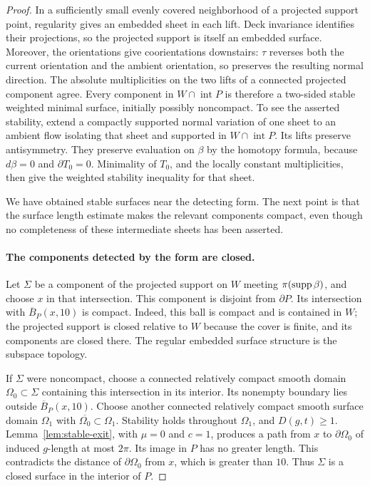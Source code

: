 \begin{proof}
In a sufficiently small evenly covered neighborhood of a projected
support point, regularity gives an embedded sheet in each lift. Deck
invariance identifies their projections, so the projected support is
itself an embedded surface. Moreover, the orientations
give coorientations downstairs: $\tau$ reverses both the current
orientation and the ambient orientation, so preserves the resulting
normal direction. The absolute multiplicities on the two lifts of a
connected projected component agree. Every component in
$W\cap\operatorname{int}P$ is therefore a two-sided stable weighted
minimal surface, initially possibly noncompact. To see the asserted
stability, extend a compactly supported normal variation of one sheet
to an ambient flow isolating that sheet and supported in
$W\cap\operatorname{int}P$. Its lifts preserve antisymmetry. They
preserve evaluation on $\beta$ by the homotopy formula, because
$d\beta=0$ and $\partial T_0=0$. Minimality of $T_0$, and the locally
constant multiplicities, then give the weighted stability inequality
for that sheet.

We have obtained stable surfaces near the detecting form. The next
point is that the surface length estimate makes the relevant components
compact, even though no completeness of these intermediate sheets has
been asserted.

\paragraph{The components detected by the form are closed.}
Let $\Sigma$ be a component of the projected support on $W$ meeting
$\pi(\operatorname{supp}\beta)$, and choose $x$ in that intersection. This component
is disjoint from $\partial P$. Its intersection with
$\overline B_P(x,10)$ is compact. Indeed, this ball is compact and is
contained in $W$; the projected support is closed relative to $W$
because the cover is finite, and its components are closed there.
The regular embedded surface structure is the subspace topology.

If $\Sigma$ were noncompact, choose a connected relatively compact
smooth domain $\Omega_0\subset\Sigma$ containing this intersection
in its interior. Its nonempty boundary lies outside
$\overline B_P(x,10)$. Choose another connected relatively compact
smooth surface domain $\Omega_1$ with
$\overline{\Omega_0}\subset\Omega_1$. Stability holds throughout
$\Omega_1$, and $D(g,t)\geq1$. Lemma~\ref{lem:stable-exit}, with
$\mu=0$ and $c=1$, produces a path from $x$ to
$\partial\Omega_0$ of induced $g$-length at most $2\pi$. Its image
in $P$ has no greater length. This contradicts the distance of
$\partial\Omega_0$ from $x$, which is greater than $10$. Thus
$\Sigma$ is a closed surface in the interior of $P$.


\end{proof}
